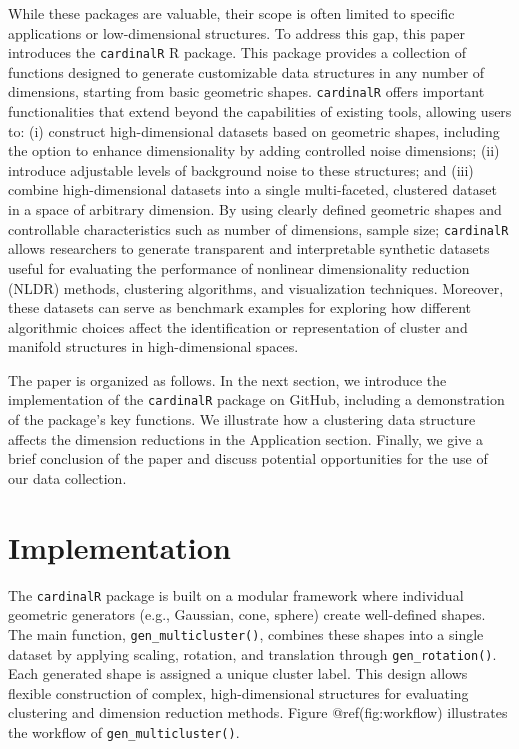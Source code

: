 \documentclass[
  11pt,
  a4paper,
]{report}
\begin{document}
While these packages are valuable, their scope is often limited to
specific applications or low-dimensional structures. To address this
gap, this paper introduces the \texttt{cardinalR} R package. This
package provides a collection of functions designed to generate
customizable data structures in any number of dimensions, starting from
basic geometric shapes. \texttt{cardinalR} offers important
functionalities that extend beyond the capabilities of existing tools,
allowing users to: (i) construct high-dimensional datasets based on
geometric shapes, including the option to enhance dimensionality by
adding controlled noise dimensions; (ii) introduce adjustable levels of
background noise to these structures; and (iii) combine high-dimensional
datasets into a single multi-faceted, clustered dataset in a space of
arbitrary dimension. By using clearly defined geometric shapes and
controllable characteristics such as number of dimensions, sample size;
\texttt{cardinalR} allows researchers to generate transparent and
interpretable synthetic datasets useful for evaluating the performance
of nonlinear dimensionality reduction (NLDR) methods, clustering
algorithms, and visualization techniques. Moreover, these datasets can
serve as benchmark examples for exploring how different algorithmic
choices affect the identification or representation of cluster and
manifold structures in high-dimensional spaces.

The paper is organized as follows. In the next section, we introduce the
implementation of the \texttt{cardinalR} package on GitHub, including a
demonstration of the package's key functions. We illustrate how a
clustering data structure affects the dimension reductions in the
Application section. Finally, we give a brief conclusion of the paper
and discuss potential opportunities for the use of our data collection.

\section{Implementation}\label{implementation-1}

The \texttt{cardinalR} package is built on a modular framework where
individual geometric generators (e.g., Gaussian, cone, sphere) create
well-defined shapes. The main function, \texttt{gen\_multicluster()},
combines these shapes into a single dataset by applying scaling,
rotation, and translation through \texttt{gen\_rotation()}. Each
generated shape is assigned a unique cluster label. This design allows
flexible construction of complex, high-dimensional structures for
evaluating clustering and dimension reduction methods. Figure
@ref(fig:workflow) illustrates the workflow of
\texttt{gen\_multicluster()}.
\end{document}

